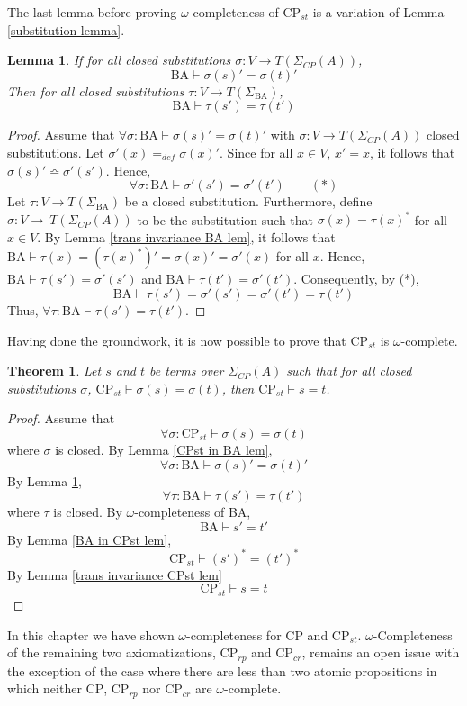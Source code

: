 \documentclass[a4paper,twoside,openright]{report}
\newcommand{\sig}{\ensuremath{\Sigma_{CP}(A)}}
\newcommand{\syn}{\bumpeq}
\newtheorem{lem}[theorem]{Lemma}
\newtheorem{thm}[theorem]{Theorem}
\begin{document}
The last lemma before proving $\omega$-completeness of $\text{CP}_{st}$ is a variation of Lemma \ref{substitution lemma}.
\begin{lem}\label{trans subst lem}
If for all closed substitutions $\sigma:V\to T(\sig)$,
\[
\text{BA}\vdash\sigma(s)'=\sigma(t)'
\]
Then for all closed substitutions $\tau:V\to T(\Sigma_\text{BA})$,
\[
\text{BA}\vdash\tau(s')=\tau(t')
\]
\end{lem}
\begin{proof}
Assume that $\forall\sigma:\text{BA}\vdash\sigma(s)'=\sigma(t)'$ with $\sigma:V\to T(\sig)$ closed substitutions. Let $\sigma'(x)=_{def}\sigma(x)'$. Since for all $x\in V$, $x'=x$, it follows that $\sigma(s)'\syn\sigma'(s')$. Hence,
\[
\forall\sigma:\text{BA}\vdash\sigma'(s')=\sigma'(t')\qquad(*)
\]
Let $\tau:V\to T(\Sigma_\text{BA})$ be a closed substitution. Furthermore, define $\sigma:V\to\ T(\sig)$ to be the substitution such that $\sigma(x)=\tau(x)^*$ for all $x\in V$. By Lemma \ref{trans invariance BA lem}, it follows that $\text{BA}\vdash\tau(x)=(\tau(x)^*)'=\sigma(x)'=\sigma'(x)$ for all $x$. Hence, $\text{BA}\vdash\tau(s')=\sigma'(s')$ and $\text{BA}\vdash\tau(t')=\sigma'(t')$. Consequently, by (*),
\[
\text{BA}\vdash\tau(s')=\sigma'(s')=\sigma'(t')=\tau(t')
\]
Thus, $\forall\tau:\text{BA}\vdash\tau(s')=\tau(t')$.
\end{proof}
Having done the groundwork, it is now possible to prove that $\text{CP}_{st}$ is $\omega$-complete.
\begin{thm}
Let $s$ and $t$ be terms over $\sig$ such that for all closed substitutions $\sigma$, $\text{CP}_{st}\vdash\sigma(s)=\sigma(t)$, then $\text{CP}_{st}\vdash s=t$.
\end{thm}
\begin{proof}
Assume that
\[
\forall\sigma:\text{CP}_{st}\vdash\sigma(s)=\sigma(t)
\]
where $\sigma$ is closed. By Lemma \ref{CPst in BA lem},
\[
\forall\sigma:\text{BA}\vdash\sigma(s)'=\sigma(t)'
\]
By Lemma \ref{trans subst lem},
\[
\forall\tau:\text{BA}\vdash\tau(s')=\tau(t')
\]
where $\tau$ is closed. By $\omega$-completeness of BA,
\[
\text{BA}\vdash s'=t'
\]
By Lemma \ref{BA in CPst lem},
\[
\text{CP}_{st}\vdash (s')^*=(t')^*
\]
By Lemma \ref{trans invariance CPst lem}
\[
\text{CP}_{st}\vdash s=t
\]
\end{proof}

In this chapter we have shown $\omega$-completeness for $\text{CP}$ and $\text{CP}_{st}$. $\omega$-Completeness of the remaining two axiomatizations, $\text{CP}_{rp}$ and $\text{CP}_{cr}$, remains an open issue with the exception of the case where there are less than two atomic propositions in which neither $\text{CP}$, $\text{CP}_{rp}$ nor $\text{CP}_{cr}$ are $\omega$-complete.
\end{document}
